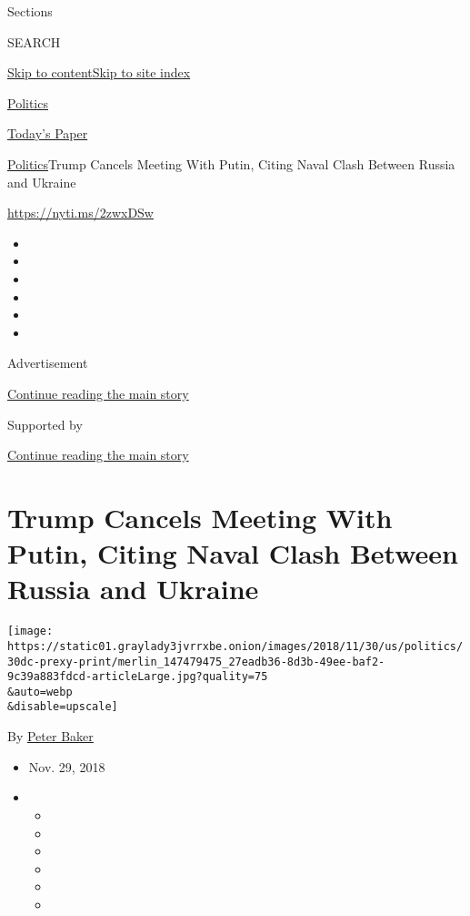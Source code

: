 Sections

SEARCH

\protect\hyperlink{site-content}{Skip to
content}\protect\hyperlink{site-index}{Skip to site index}

\href{https://www.nytimes3xbfgragh.onion/section/politics}{Politics}

\href{https://myaccount.nytimes3xbfgragh.onion/auth/login?response_type=cookie\&client_id=vi}{}

\href{https://www.nytimes3xbfgragh.onion/section/todayspaper}{Today's
Paper}

\href{/section/politics}{Politics}\textbar{}Trump Cancels Meeting With
Putin, Citing Naval Clash Between Russia and Ukraine

\url{https://nyti.ms/2zwxDSw}

\begin{itemize}
\item
\item
\item
\item
\item
\item
\end{itemize}

Advertisement

\protect\hyperlink{after-top}{Continue reading the main story}

Supported by

\protect\hyperlink{after-sponsor}{Continue reading the main story}

\hypertarget{trump-cancels-meeting-with-putin-citing-naval-clash-between-russia-and-ukraine}{%
\section{Trump Cancels Meeting With Putin, Citing Naval Clash Between
Russia and
Ukraine}\label{trump-cancels-meeting-with-putin-citing-naval-clash-between-russia-and-ukraine}}

\texttt{[image: https://static01.graylady3jvrrxbe.onion/images/2018/11/30/us/politics/30dc-prexy-print/merlin\_147479475\_27eadb36-8d3b-49ee-baf2-9c39a883fdcd-articleLarge.jpg?quality=75\\\&auto=webp\\\&disable=upscale]}

By \href{https://www.nytimes3xbfgragh.onion/by/peter-baker}{Peter Baker}

\begin{itemize}
\item
  Nov. 29, 2018
\item
  \begin{itemize}
  \item
  \item
  \item
  \item
  \item
  \item
  \end{itemize}
\end{itemize}

